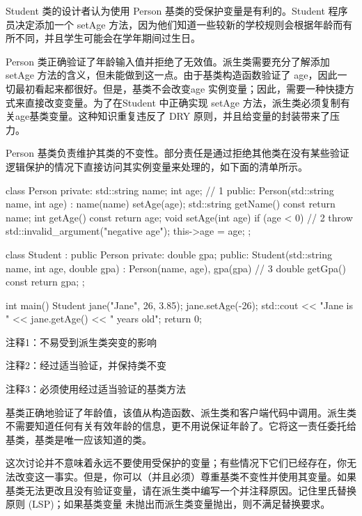 Student 类的设计者认为使用 Person 基类的受保护变量是有利的。Student 程序员决定添加一个 setAge 方法，因为他们知道一些较新的学校规则会根据年龄而有所不同，并且学生可能会在学年期间过生日。

Person 类正确验证了年龄输入值并拒绝了无效值。派生类需要充分了解添加 setAge 方法的含义，但未能做到这一点。由于基类构造函数验证了 age，因此一切最初看起来都很好。但是，基类不会改变age 实例变量；因此，需要一种快捷方式来直接改变变量。为了在Student 中正确实现 setAge 方法，派生类必须复制有关age基类变量。这种知识重复违反了 DRY 原则，并且给变量的封装带来了压力。


Person 基类负责维护其类的不变性。部分责任是通过拒绝其他类在没有某些验证逻辑保护的情况下直接访问其实例变量来处理的，如下面的清单所示。


\begin{cpp}
class Person {
private:
  std::string name;
  int age; // 1
public:
  Person(std::string name, int age) : name(name) { setAge(age); }
  std::string getName() const { return name; }
  int getAge() const { return age; }
  void setAge(int age) {
    if (age < 0) // 2
      throw std::invalid_argument("negative age");
    this->age = age;
  }
};

class Student : public Person {
private:
  double gpa;
public:
  Student(std::string name, int age, double gpa) :
    Person(name, age), gpa(gpa) {} // 3
  double getGpa() const { return gpa; }
};

int main() {
  Student jane("Jane", 26, 3.85);
  jane.setAge(-26);
  std::cout << "Jane is " << jane.getAge() << " years old\n";
  return 0;
}
\end{cpp}

{\footnotesize
注释1：不易受到派生类突变的影响

注释2：经过适当验证，并保持类不变

注释3：必须使用经过适当验证的基类方法
}

基类正确地验证了年龄值，该值从构造函数、派生类和客户端代码中调用。派生类不需要知道任何有关有效年龄的信息，更不用说保证年龄了。它将这一责任委托给基类，基类是唯一应该知道的类。

这次讨论并不意味着永远不要使用受保护的变量；有些情况下它们已经存在，你无法改变这一事实。但是，你可以（并且必须）尊重基类不变性并使用其变量。如果基类无法更改且没有验证变量，请在派生类中编写一个并注释原因。记住里氏替换原则 (LSP)；如果基类变量 未抛出而派生类变量抛出，则不满足替换要求。

